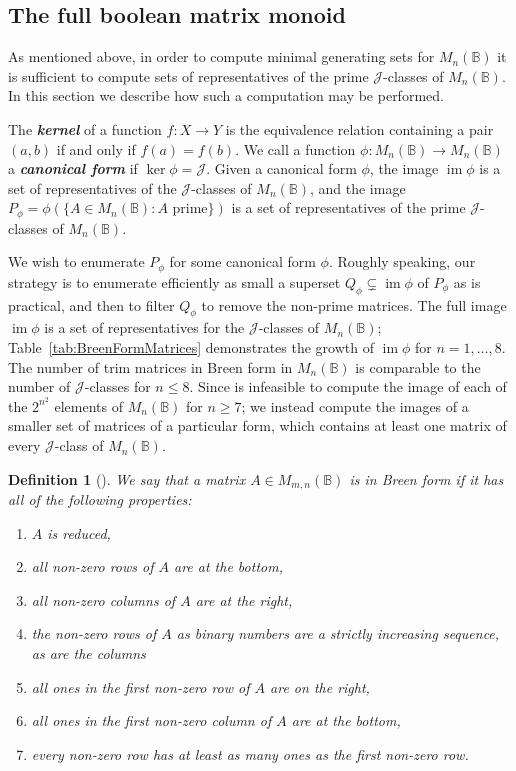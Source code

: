 \documentclass[11pt]{article}
\newtheorem{defi}[thm]{Definition}
\newenvironment{de}[1][]{\begin{defi}[#1]\rm}{\end{defi}}
\newcommand{\defn}[1]{\textbf{\textit{#1}}}
\numberwithin{equation}{section}
\newcommand{\set}[2]{\ensuremath{\{#1 : #2 \}}}
\renewcommand{\to}{\longrightarrow}
\DeclareMathOperator{\im}{im}
\newcommand{\B}{\mathbb{B}}
\newcommand{\Bn}{M_n(\B)}
\newcommand{\Bmn}{M_{m,n}(\B)}
\newcommand{\J}{\mathscr{J}}
\begin{document}
\subsection{The full boolean matrix monoid}
\label{sec:FullBoolMat}
As mentioned above, in order to compute minimal generating sets for $\Bn$ it is
sufficient to compute sets of representatives of the prime $\J$-classes of
$\Bn$. In this section we describe how such a computation may be performed.

The \defn{kernel} of a function $f: X \to Y$ is the equivalence relation
containing a pair $(a, b)$ if and only if $f(a) = f(b)$.
We call a function $\phi: \Bn \to \Bn$ a \defn{canonical form} if
$\ker\phi = \J$. Given a canonical form $\phi$, the image $\im\phi$ is a
set of representatives of the $\J$-classes of $\Bn$, and the image
$P_\phi = \phi(\set{A \in \Bn}{\text{$A$ prime}})$ is a set of
representatives of the prime $\J$-classes of $\Bn$. 

We wish to enumerate $P_\phi$ for some canonical form $\phi$. Roughly speaking,
our strategy is to enumerate efficiently as small a superset $Q_\phi \subsetneq
\im\phi$ of $P_\phi$ as is practical, and then to filter $Q_\phi$ to remove the
non-prime matrices.
The full image $\im\phi$ is a set of representatives for the $\J$-classes of
$\Bn$; Table~\ref{tab:BreenFormMatrices} demonstrates the growth of $\im\phi$ for
$n = 1, \ldots, 8$. The number of trim matrices in Breen form in $\Bn$ is
comparable to the number of $\J$-classes for $n \leq 8$.
Since is infeasible to compute the image of each of the $2^{n^2}$ elements of
$\Bn$ for $n \geq 7$; we instead compute the images of a smaller set of matrices
of a particular form, which contains at least one matrix of every $\J$-class of
$\Bn$.

\begin{de}[{{\cite[Proposition 3.6]{Breen1997aa}}}]
  We say that a matrix $A \in \Bmn$ is in \emph{Breen form} if it has all of
  the following properties:
  \begin{enumerate}[label={\rm (\roman*)}]
  \item{$A$ is reduced,}
  \item{all non-zero rows of $A$ are at the bottom,}
  \item{all non-zero columns of $A$ are at the right,}
  \item{the non-zero rows of $A$ as binary numbers are a strictly increasing
      sequence, as are the columns}
  \item{all ones in the first non-zero row of $A$ are on the right,}
  \item{all ones in the first non-zero column of $A$ are at the bottom,}
  \item{every non-zero row has at least as many ones as the first non-zero row.}
  \end{enumerate}
\end{de}
\end{document}
